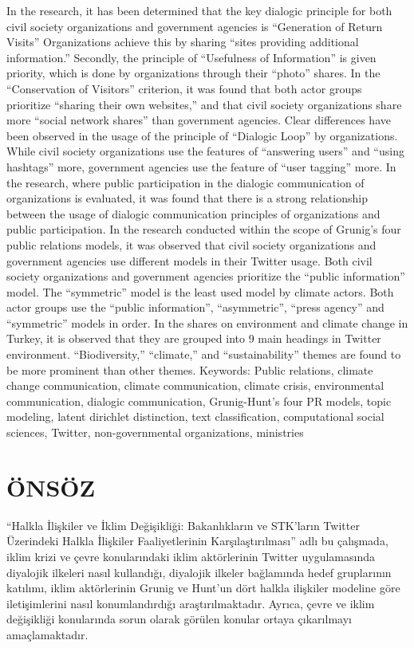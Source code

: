 \documentclass[
]{book}
\begin{document}
In the research, it has been determined that the key dialogic principle for both civil society organizations and government agencies is ``Generation of Return Visits'' Organizations achieve this by sharing ``sites providing additional information.'' Secondly, the principle of ``Usefulness of Information'' is given priority, which is done by organizations through their ``photo'' shares. In the ``Conservation of Visitors'' criterion, it was found that both actor groups prioritize ``sharing their own websites,'' and that civil society organizations share more ``social network shares'' than government agencies. Clear differences have been observed in the usage of the principle of ``Dialogic Loop'' by organizations. While civil society organizations use the features of ``answering users'' and ``using hashtags'' more, government agencies use the feature of ``user tagging'' more. In the research, where public participation in the dialogic communication of organizations is evaluated, it was found that there is a strong relationship between the usage of dialogic communication principles of organizations and public participation. In the research conducted within the scope of Grunig's four public relations models, it was observed that civil society organizations and government agencies use different models in their Twitter usage. Both civil society organizations and government agencies prioritize the ``public information'' model. The ``symmetric'' model is the least used model by climate actors. Both actor groups use the ``public information'', ``asymmetric'', ``press agency'' and ``symmetric'' models in order. In the shares on environment and climate change in Turkey, it is observed that they are grouped into 9 main headings in Twitter environment. ``Biodiversity,'' ``climate,'' and ``sustainability'' themes are found to be more prominent than other themes.
Keywords: Public relations, climate change communication, climate communication, climate crisis, environmental communication, dialogic communication, Grunig-Hunt's four PR models, topic modeling, latent dirichlet distinction, text classification, computational social sciences, Twitter, non-governmental organizations, ministries

\hypertarget{uxf6nsuxf6z}{%
\chapter*{ÖNSÖZ}\label{uxf6nsuxf6z}}

``Halkla İlişkiler ve İklim Değişikliği: Bakanlıkların ve STK'ların Twitter Üzerindeki Halkla İlişkiler Faaliyetlerinin Karşılaştırılması'' adlı bu çalışmada, iklim krizi ve çevre konularındaki iklim aktörlerinin Twitter uygulamasında diyalojik ilkeleri nasıl kullandığı, diyalojik ilkeler bağlamında hedef gruplarının katılımı, iklim aktörlerinin Grunig ve Hunt'un dört halkla ilişkiler modeline göre iletişimlerini nasıl konumlandırdığı araştırılmaktadır. Ayrıca, çevre ve iklim değişikliği konularında sorun olarak görülen konular ortaya çıkarılmayı amaçlamaktadır.
\end{document}
